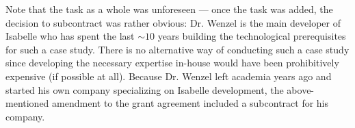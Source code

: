 Note that the task as a whole was unforeseen --- once the task was added, the decision to subcontract was rather obvious:
Dr. Wenzel is the main developer of Isabelle who has spent the last $\sim 10$ years building the technological prerequisites for such a case study.
There is no alternative way of conducting such a case study since developing the necessary expertise in-house would have been prohibitively expensive (if possible at all).
Because Dr. Wenzel left academia years ago and started his own company
specializing on Isabelle development, the above-mentioned amendment to
the grant agreement included a subcontract for his company.



